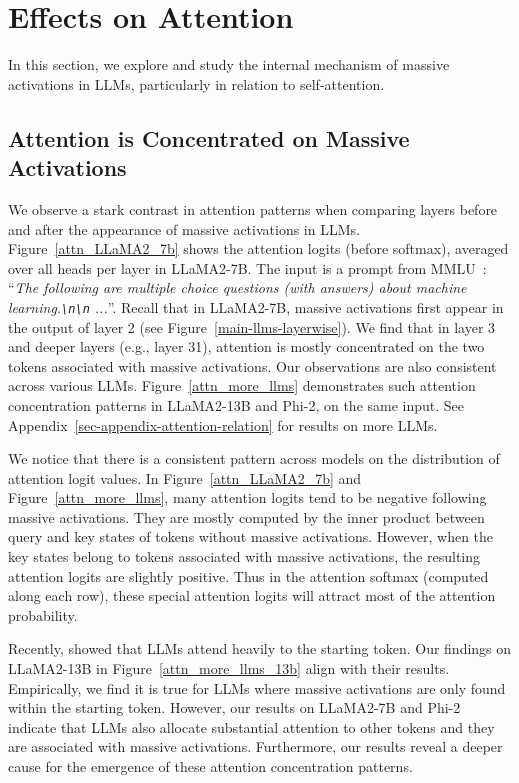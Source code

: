 \section{Effects on Attention}\label{label-attn-bias}
In this section, we explore and study the internal mechanism of massive activations in LLMs, particularly in relation to self-attention. 

\subsection{Attention is Concentrated on Massive Activations}\label{sec-attn-concentrate}

We observe a stark contrast in attention patterns when comparing layers before and after the appearance of massive activations in LLMs. Figure~\ref{attn_LLaMA2_7b} shows the attention logits (before softmax), averaged over all heads per layer in LLaMA2-7B.  The input is a prompt from MMLU~\citep{hendrycks2021mmlu}: ``\textsl{The following are multiple choice questions (with answers) about machine learning.\texttt{\textbackslash n}\texttt{\textbackslash n} ...}''. Recall that in LLaMA2-7B, massive activations first appear in the output of layer 2 (see Figure~\ref{main-llms-layerwise}). We find that in layer 3 and deeper layers (e.g., layer 31), attention is mostly concentrated on the two tokens associated with massive activations. Our observations are also consistent across various LLMs.  Figure~\ref{attn_more_llms} demonstrates such attention concentration patterns in LLaMA2-13B and Phi-2, on the same input. See Appendix~\ref{sec-appendix-attention-relation} for results on more LLMs.

We notice that there is a consistent pattern across models on the distribution of attention logit values. In Figure~\ref{attn_LLaMA2_7b} and Figure~\ref{attn_more_llms}, many attention logits tend to be negative following massive activations. They are mostly computed by the inner product between query and key states of tokens without massive activations. However, when the key states belong to tokens associated with massive activations, the resulting attention logits are slightly positive. Thus in the attention softmax (computed along each row), these special attention logits will attract most of the attention probability.

Recently, \citet{xiao2023sink} showed that LLMs attend heavily to the starting token. Our findings on LLaMA2-13B in Figure~\ref{attn_more_llms_13b} align with their results. Empirically, we find it is true for LLMs where massive activations are only found within the starting token. However, our results on LLaMA2-7B and Phi-2 indicate that LLMs also allocate substantial attention to other tokens and they are associated with massive activations. Furthermore, our results reveal a deeper cause for the emergence of these attention concentration patterns. 

